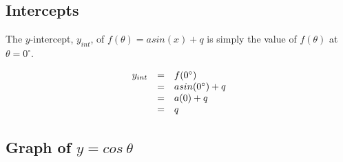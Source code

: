 \subsection*{Intercepts}
\nopagebreak
The $y$-intercept, ${y}_{int}$, of $f(\theta )=asin(x)+q$ is simply the value of $f(\theta )$ at $\theta ={0}^{\circ }$.\par 
\nopagebreak\noindent{}
\begin{equation*}
\begin{array}{ccc}\hfill {y}_{int}& =& f({0}^{\circ })\hfill \\ & =& asin({0}^{\circ })+q\hfill \\ & =& a(0)+q\hfill \\ & =& q\hfill \end{array}
\end{equation*}



\subsection{Graph of $y=cos~\theta $}
